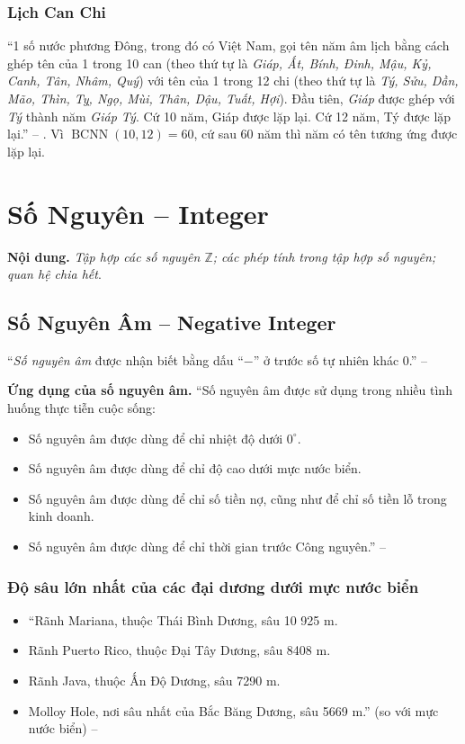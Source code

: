 \documentclass{article}
\numberwithin{equation}{section}
\begin{document}
\subsubsection{Lịch Can Chi}
``1 số nước phương Đông, trong đó có Việt Nam, gọi tên năm âm lịch bằng cách ghép tên của 1 trong 10 can (theo thứ tự là \textit{Giáp, Ất, Bính, Đinh, Mậu, Kỷ, Canh, Tân, Nhâm, Quý}) với tên của 1 trong 12 chi (theo thứ tự là \textit{Tý, Sửu, Dần, Mão, Thìn, Tỵ, Ngọ, Mùi, Thân, Dậu, Tuất, Hợi}). Đầu tiên, \textit{Giáp} được ghép với \textit{Tý} thành năm \textit{Giáp Tý}. Cứ 10 năm, Giáp được lặp lại. Cứ 12 năm, Tý được lặp lại.'' -- \cite[p. 58]{SGK_Toan_6_Canh_Dieu_tap_1}. Vì $\operatorname{BCNN}(10,12) = 60$, cứ sau 60 năm thì năm có tên tương ứng được lặp lại.


\section{Số Nguyên -- Integer}
\textbf{Nội dung.} \textit{Tập hợp các số nguyên $\mathbb{Z}$; các phép tính trong tập hợp số nguyên; quan hệ chia hết}.

\subsection{Số Nguyên Âm -- Negative Integer}
``\emph{Số nguyên âm} được nhận biết bằng dấu ``$-$'' ở trước số tự nhiên khác 0.'' -- \cite[p. 61]{SGK_Toan_6_Canh_Dieu_tap_1}

\noindent\textbf{Ứng dụng của số nguyên âm.} ``Số nguyên âm được sử dụng trong nhiều tình huống thực tiễn cuộc sống:
\begin{itemize}
	\item Số nguyên âm được dùng để chỉ nhiệt độ dưới $0^\circ$.
	\item Số nguyên âm được dùng để chỉ độ cao dưới mực nước biển.
	\item Số nguyên âm được dùng để chỉ số tiền nợ, cũng như để chỉ số tiền lỗ trong kinh doanh.
	\item Số nguyên âm được dùng để chỉ thời gian trước Công nguyên.'' -- \cite[p. 62]{SGK_Toan_6_Canh_Dieu_tap_1}
\end{itemize}

\subsubsection{Độ sâu lớn nhất của các đại dương dưới mực nước biển}
\begin{itemize}
	\item ``Rãnh Mariana, thuộc Thái Bình Dương, sâu 10 925 m.
	\item Rãnh Puerto Rico, thuộc Đại Tây Dương, sâu 8408 m.
	\item Rãnh Java, thuộc Ấn Độ Dương, sâu 7290 m.
	\item Molloy Hole, nơi sâu nhất của Bắc Băng Dương, sâu 5669 m.'' (so với mực nước biển) -- \cite[p. 63]{SGK_Toan_6_Canh_Dieu_tap_1}
\end{itemize}
\end{document}

